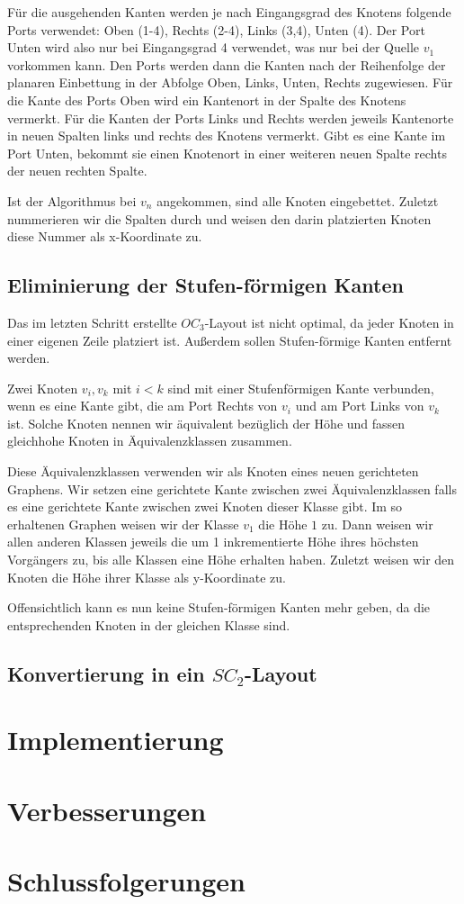 \documentclass[a4paper]{scrreprt}
\theoremstyle{definition}
\begin{document}
Für die ausgehenden Kanten werden je nach Eingangsgrad des Knotens folgende Ports verwendet: Oben (1-4), Rechts (2-4), Links (3,4), Unten (4). Der Port Unten wird also nur bei Eingangsgrad 4 verwendet, was nur bei der Quelle $v_1$ vorkommen kann. Den Ports werden dann die Kanten nach der Reihenfolge der planaren Einbettung in der Abfolge Oben, Links, Unten, Rechts zugewiesen. 
Für die Kante des Ports Oben wird ein Kantenort in der Spalte des Knotens vermerkt. Für die Kanten der Ports Links und Rechts werden jeweils Kantenorte in neuen Spalten links und rechts des Knotens vermerkt. Gibt es eine Kante im Port Unten, bekommt sie einen Knotenort in einer weiteren neuen Spalte rechts der neuen rechten Spalte. 

Ist der Algorithmus bei $v_n$ angekommen, sind alle Knoten eingebettet. Zuletzt nummerieren wir die Spalten durch und weisen den darin platzierten Knoten diese Nummer als x-Koordinate zu. 

\section{Eliminierung der Stufen-förmigen Kanten}

Das im letzten Schritt erstellte $OC_3$-Layout ist nicht optimal, da jeder Knoten in einer eigenen Zeile platziert ist. Außerdem sollen Stufen-förmige Kanten entfernt werden.

Zwei Knoten $v_i, v_k$ mit $i < k$ sind mit einer Stufenförmigen Kante verbunden, wenn es eine Kante gibt, die am Port Rechts von $v_i$ und am Port Links von $v_k$ ist. Solche Knoten nennen wir äquivalent bezüglich der Höhe und fassen gleichhohe Knoten in Äquivalenzklassen zusammen.

Diese Äquivalenzklassen verwenden wir als Knoten eines neuen gerichteten Graphens. Wir setzen eine gerichtete Kante zwischen zwei Äquivalenzklassen falls es eine gerichtete Kante zwischen zwei Knoten dieser Klasse gibt. Im so erhaltenen Graphen weisen wir der Klasse ${v_1}$ die Höhe $1$ zu. Dann weisen wir allen anderen Klassen jeweils die um 1 inkrementierte Höhe ihres höchsten Vorgängers zu, bis alle Klassen eine Höhe erhalten haben. Zuletzt weisen wir den Knoten die Höhe ihrer Klasse als y-Koordinate zu.

Offensichtlich kann es nun keine Stufen-förmigen Kanten mehr geben, da die entsprechenden Knoten in der gleichen Klasse sind.

\section{Konvertierung in ein $SC_2$-Layout}



\chapter{Implementierung}

\chapter{Verbesserungen}

\chapter{Schlussfolgerungen}








\end{document}
